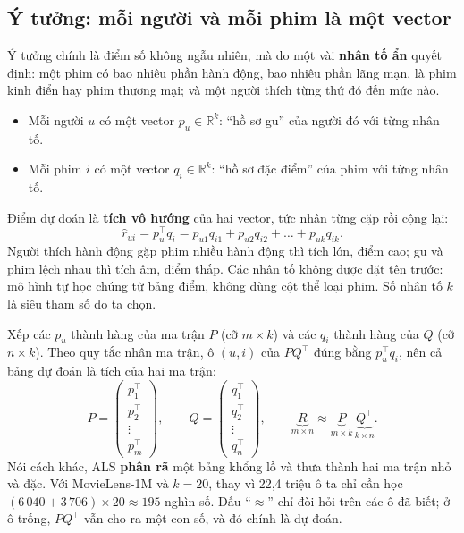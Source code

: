 \subsection{Ý tưởng: mỗi người và mỗi phim là một vector}

Ý tưởng chính là điểm số không ngẫu nhiên, mà do một vài \textbf{nhân tố ẩn} quyết định: một phim có bao
nhiêu phần hành động, bao nhiêu phần lãng mạn, là phim kinh điển hay phim thương mại; và một người thích
từng thứ đó đến mức nào.
\begin{itemize}
  \item Mỗi người $u$ có một vector $p_u \in \mathbb{R}^k$: ``hồ sơ gu'' của người đó với từng nhân tố.
  \item Mỗi phim $i$ có một vector $q_i \in \mathbb{R}^k$: ``hồ sơ đặc điểm'' của phim với từng nhân tố.
\end{itemize}
Điểm dự đoán là \textbf{tích vô hướng} của hai vector, tức nhân từng cặp rồi cộng lại:
\begin{equation}
  \hat r_{ui} = p_u^\top q_i = p_{u1} q_{i1} + p_{u2} q_{i2} + \dots + p_{uk} q_{ik} .
\end{equation}
Người thích hành động gặp phim nhiều hành động thì tích lớn, điểm cao; gu và phim lệch nhau thì tích âm,
điểm thấp. Các nhân tố không được đặt tên trước: mô hình tự học chúng từ bảng điểm, không dùng cột thể loại
phim. Số nhân tố $k$ là siêu tham số do ta chọn.

Xếp các $p_u$ thành hàng của ma trận $P$ (cỡ $m \times k$) và các $q_i$ thành hàng của $Q$ (cỡ
$n \times k$). Theo quy tắc nhân ma trận, ô $(u, i)$ của $PQ^\top$ đúng bằng $p_u^\top q_i$, nên cả bảng
dự đoán là tích của hai ma trận:
\[
  P = \begin{pmatrix} p_1^\top \\ p_2^\top \\ \vdots \\ p_m^\top \end{pmatrix},\qquad
  Q = \begin{pmatrix} q_1^\top \\ q_2^\top \\ \vdots \\ q_n^\top \end{pmatrix},\qquad
  \underbrace{R}_{m \times n} \approx \underbrace{P}_{m \times k}\, \underbrace{Q^\top}_{k \times n} .
\]
Nói cách khác, ALS \textbf{phân rã} một bảng khổng lồ và thưa thành hai ma trận nhỏ và đặc. Với
MovieLens-1M và $k = 20$, thay vì 22,4 triệu ô ta chỉ cần học $(6\,040 + 3\,706) \times 20 \approx 195$
nghìn số. Dấu ``$\approx$'' chỉ đòi hỏi trên các ô đã biết; ở ô trống, $PQ^\top$ vẫn cho ra một con số,
và đó chính là dự đoán.

